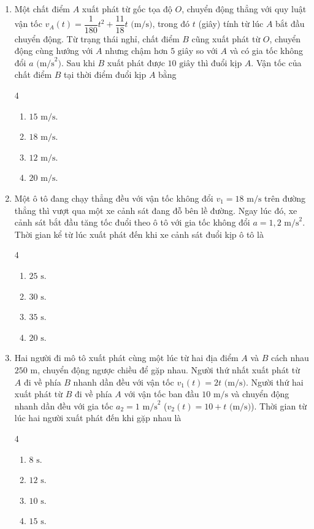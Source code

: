 \documentclass[12pt]{article}
\begin{document}
\begin{enumerate}[label=\textbf{Câu \arabic*.}]
		\item Một chất điểm $A$ xuất phát từ gốc tọa độ $O$, chuyển động thẳng với quy luật vận tốc $v_A(t) = \dfrac{1}{180}t^2 + \dfrac{11}{18}t\text{ (m/s)}$, trong đó $t$ (giây) tính từ lúc $A$ bắt đầu chuyển động. Từ trạng thái nghỉ, chất điểm $B$ cũng xuất phát từ $O$, chuyển động cùng hướng với $A$ nhưng chậm hơn $5\text{ giây}$ so với $A$ và có gia tốc không đổi $a\text{ (m/s}^2\text{)}$. Sau khi $B$ xuất phát được $10\text{ giây}$ thì đuổi kịp $A$. Vận tốc của chất điểm $B$ tại thời điểm đuổi kịp $A$ bằng
		\begin{multicols}{4}
			\begin{enumerate}[label=\textbf{\Alph*.}]
				\item $15\text{ m/s}$.
				\item $18\text{ m/s}$.
				\item $12\text{ m/s}$.
				\item $20\text{ m/s}$.
			\end{enumerate}
		\end{multicols}
		
		\item Một ô tô đang chạy thẳng đều với vận tốc không đổi $v_1 = 18\text{ m/s}$ trên đường thẳng thì vượt qua một xe cảnh sát đang đỗ bên lề đường. Ngay lúc đó, xe cảnh sát bắt đầu tăng tốc đuổi theo ô tô với gia tốc không đổi $a = 1{,}2\text{ m/s}^2$. Thời gian kể từ lúc xuất phát đến khi xe cảnh sát đuổi kịp ô tô là
		\begin{multicols}{4}
			\begin{enumerate}[label=\textbf{\Alph*.}]
				\item $25\text{ s}$.
				\item $30\text{ s}$.
				\item $35\text{ s}$.
				\item $20\text{ s}$.
			\end{enumerate}
		\end{multicols}
		
		\item Hai người đi mô tô xuất phát cùng một lúc từ hai địa điểm $A$ và $B$ cách nhau $250\text{ m}$, chuyển động ngược chiều để gặp nhau. Người thứ nhất xuất phát từ $A$ đi về phía $B$ nhanh dần đều với vận tốc $v_1(t) = 2t\text{ (m/s)}$. Người thứ hai xuất phát từ $B$ đi về phía $A$ với vận tốc ban đầu $10\text{ m/s}$ và chuyển động nhanh dần đều với gia tốc $a_2 = 1\text{ m/s}^2$ ($v_2(t) = 10 + t\text{ (m/s)}$). Thời gian từ lúc hai người xuất phát đến khi gặp nhau là
		\begin{multicols}{4}
			\begin{enumerate}[label=\textbf{\Alph*.}]
				\item $8\text{ s}$.
				\item $12\text{ s}$.
				\item $10\text{ s}$.
				\item $15\text{ s}$.
			\end{enumerate}
		\end{multicols}
	\end{enumerate}
	
\end{document}

